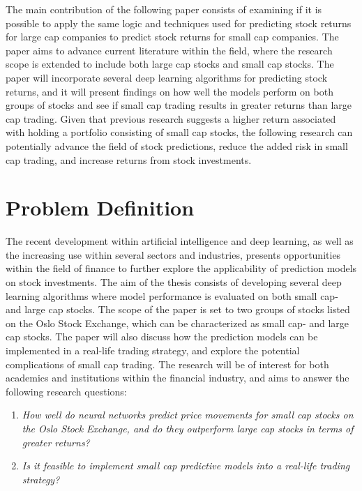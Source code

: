 \indent \newline 
The main contribution of the following paper consists of examining if it is possible to apply the same logic and techniques used for predicting stock returns for large cap companies to predict stock returns for small cap companies. The paper aims to advance current literature within the field, where the research scope is extended to include both large cap stocks and small cap stocks. The paper will incorporate several deep learning algorithms for predicting stock returns, and it will present findings on how well the models perform on both groups of stocks and see if small cap trading results in greater returns than large cap trading. Given that previous research suggests a higher return associated with holding a portfolio consisting of small cap stocks, the following research can potentially advance the field of stock predictions, reduce the added risk in small cap trading, and increase returns from stock investments.  

\section{Problem Definition}
The recent development within artificial intelligence and deep learning, as well as the increasing use within several sectors and industries, presents opportunities within the field of finance to further explore the applicability of prediction models on stock investments. The aim of the thesis consists of developing several deep learning algorithms where model performance is evaluated on both small cap- and large cap stocks. The scope of the paper is set to two groups of stocks listed on the Oslo Stock Exchange, which can be characterized as small cap- and large cap stocks. The paper will also discuss how the prediction models can be implemented in a real-life trading strategy, and explore the potential complications of small cap trading. The research will be of interest for both academics and institutions within the financial industry, and aims to answer the following research questions:  

\indent \newline
\begin{enumerate}
\item \textit{How well do neural networks predict price movements for small cap stocks on the Oslo Stock Exchange, and do they outperform large cap stocks in terms of greater returns?}
\item \textit{Is it feasible to implement small cap predictive models into a real-life trading strategy?}
\end{enumerate}

